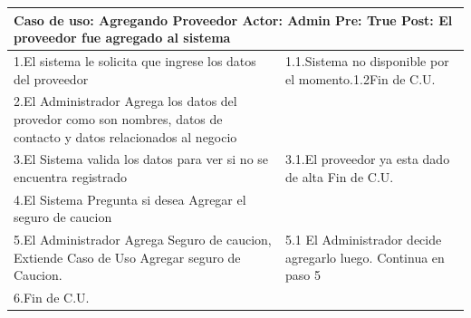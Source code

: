 \begin{longtable}{| p{} | p{} |} 
    \hline
    \multicolumn{2}{|p{16cm}|}{
        \textbf{Caso de uso:} Agregando Proveedor \newline
        \textbf{Actor:} Admin\newline
        \textbf{Pre:}  True\newline
        \textbf{Post:} El proveedor fue agregado al sistema
    }\\
    \hline
    1.El sistema le solicita que ingrese los datos del proveedor & 1.1.Sistema no  disponible por el momento.\newline 1.2Fin de C.U.\\
    \hline
    2.El Administrador Agrega los datos del provedor como son nombres, datos de contacto y datos relacionados al negocio &  \\
    \hline
    3.El Sistema valida los datos para ver si no se encuentra registrado & 3.1.El proveedor ya esta dado de alta \newline 3.2 Fin de C.U.  \\
    \hline
    4.El Sistema Pregunta si desea Agregar el seguro de caucion&\\
    \hline
    5.El Administrador Agrega Seguro de caucion, Extiende Caso de Uso Agregar seguro de Caucion. & 5.1 El Administrador decide agregarlo luego. Continua en paso 5 \\
    \hline
    6.Fin de C.U.& \\
    \hline
\end{longtable}

